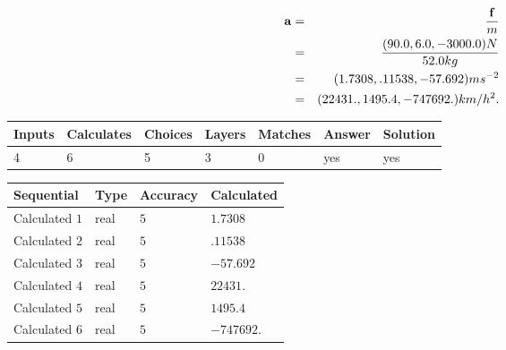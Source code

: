 \documentclass[12pt]{article}
\begin{document}
\begin{eqnarray*}
\mathbf{a}&=&\frac{\mathbf{f}}m  \\
&=&\frac{(
90.0 ,
6.0 ,
-3000.0 )N
}{ %
52.0 kg}  \\
&=&(
1.7308 ,
.11538,
-57.692
)ms^{-2} \\
&=&(
22431. ,
1495.4 ,
-747692.
)km/h^2.
\end{eqnarray*}
 
 
 
\noindent{}
 
 

 
\vspace{0.3in}
   
   
   
   
\noindent\begin{tabular}{|l|l|l|l|l|l|l|}
 \hline
Inputs & Calculates & Choices & Layers & Matches & Answer & Solution \\ \hline
           4 & 
           6 & 
           5
  & 
           3 & 
           0 & 
  yes & 
  yes 
  \\ \hline
 \end{tabular}
   
   
   
   
\noindent{}
   
   
  
  
\noindent\begin{tabular}{|l|l|l|l|}
\hline
 Sequential & Type & Accuracy & Calculated \\ 
\hline
 
 
  Calculated $           1$ & real & $           5 $ & 
 $ 1.7308 $ 
 \\  \hline  
 
 
  Calculated $           2$ & real & $           5 $ & 
 $ .11538 $ 
 \\  \hline  
 
 
  Calculated $           3$ & real & $           5 $ & 
 $ -57.692 $ 
 \\  \hline  
 
 
  Calculated $           4$ & real & $           5 $ & 
 $ 22431. $ 
 \\  \hline  
 
 
  Calculated $           5$ & real & $           5 $ & 
 $ 1495.4 $ 
 \\  \hline  
 
 
  Calculated $           6$ & real & $           5 $ & 
 $ -747692. $ 
 \\  \hline  
 \end{tabular}
   
\end{document}

